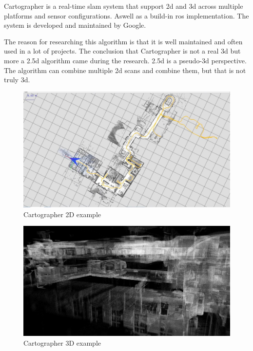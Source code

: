 Cartographer is a real\hyp{}time \acs{slam} system that support \acs{2d} and \acs{3d} across multiple platforms and sensor configurations. Aswell as a build\hyp{}in \acs{ros} implementation. The system is developed and maintained by Google. \cite{cartographer_ros_integration}

The reason for researching this algorithm is that it is well maintained and often used in a lot of projects. The conclusion that Cartographer is not a real \acs{3d} but more a \acs{2.5d} algorithm came during the research. \acs{2.5d} is a pseudo\hyp{}\acs{3d} perspective. The algorithm can combine multiple \acs{2d} scans and combine them, but that is not truly \acs{3d}. \cite{liang2016generating}

\begin{figure}[!h]
  \centering
  \includegraphics[width=0.75\linewidth]{images/cartographer_2d.jpg}
  \caption{Cartographer 2D example \cite{cartographer_google_open_source}}
\end{figure}

\begin{figure}[!h]
  \centering
  \includegraphics[width=0.75\linewidth]{images/cartographer_3d.jpg}
  \caption{Cartographer 3D example \cite{cartographer_exploiting_map}}
\end{figure}